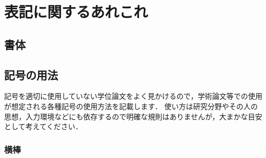 \chapter{表記に関するあれこれ}
\label{ch:notation}

\section{書体}
\label{sec:typeface}

\section{記号の用法}
\label{sec:mark}

記号を適切に使用していない学位論文をよく見かけるので，学術論文等での使用が想定される各種記号の使用方法を記載します．
使い方は研究分野やその人の思想，入力環境などにも依存するので明確な規則はありませんが，大まかな目安として考えてください．

\subsection*{横棒}

